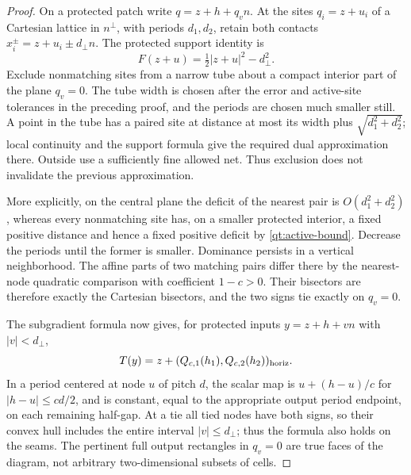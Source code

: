 \begin{proof}
On a protected patch write $q=z+h+q_v n$.  At the sites $q_i=z+u_i$ of
a Cartesian lattice in $n^\perp$, with periods $d_1,d_2$, retain both
contacts $x_i^\pm=z+u_i\pm d_\perp n$.  The protected support identity is
\[
 F(z+u)=\tfrac12|z+u|^2-d_\perp^2.
\]
Exclude nonmatching sites from a narrow tube about a compact interior
part of the plane $q_v=0$.  The tube width is chosen after the error and
active-site tolerances in the preceding proof, and the periods are
chosen much smaller still.  A point in the tube has a paired site at
distance at most its width plus $\sqrt{d_1^2+d_2^2}$; local continuity
and the support formula give the required dual approximation there.
Outside use a sufficiently fine allowed net.  Thus exclusion does not
invalidate the previous approximation.

More explicitly, on the central plane the deficit of the nearest pair
is $O(d_1^2+d_2^2)$, whereas every nonmatching site has, on a smaller
protected interior, a fixed positive distance and hence a fixed
positive deficit by \eqref{qt:active-bound}.  Decrease the periods until
the former is smaller.  Dominance persists in a vertical neighborhood.
The affine parts of two matching pairs differ there by the nearest-node
quadratic comparison with coefficient $1-c>0$.  Their bisectors are
therefore exactly the Cartesian bisectors, and the two signs tie
exactly on $q_v=0$.

The subgradient formula now gives, for protected inputs
$y=z+h+vn$ with $|v|<d_\perp$,
\begin{equation}\label{qt:scalar-quantizer}
 T(y)=z+(Q_{c,1}(h_1),Q_{c,2}(h_2))_{\rm horiz}.
\end{equation}
In a period centered at node $u$ of pitch $d$, the scalar map is
$u+(h-u)/c$ for $|h-u|\leq cd/2$, and is constant, equal to the
appropriate output period endpoint, on each remaining half-gap.
At a tie all tied nodes have both signs, so their convex hull includes
the entire interval $|v|\leq d_\perp$; thus the formula also holds on
the seams.  The pertinent full output rectangles in $q_v=0$ are true
faces of the diagram, not arbitrary two-dimensional subsets of cells.


\end{proof}
